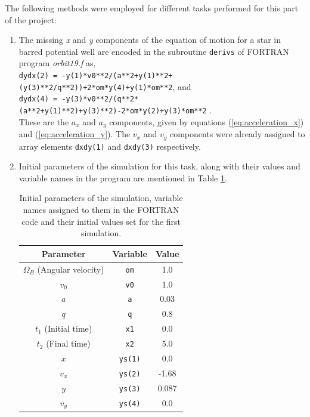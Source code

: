 \documentclass[a4paper]{article}
\begin{document}
		The following methods were employed for different tasks performed for this part of the project:
		\begin{enumerate}
			
			\item The missing \textit{x} and \textit{y} components of the equation of motion for a star in barred potential well are encoded in the subroutine \texttt{derivs} of FORTRAN program \textit{orbit19.f} as, \\
			
			\noindent \texttt{dydx(2) = -y(1)*v0**2/(a**2+y(1)**2+(y(3)**2/q**2))+2*om*y(4)+y(1)*om**2}, and \\
			\texttt{dydx(4) = -y(3)*v0**2/(q**2*(a**2+y(1)**2)+y(3)**2)-2*om*y(2)+y(3)*om**2} . \\
			
			These are the \(a_x\) and \(a_y\) components, given by equations (\ref{eq:acceleration_x}) and (\ref{eq:acceleration_y}). The \(v_x\) and \(v_y\) components were already assigned to array elements \texttt{dxdy(1)} and \texttt{dxdy(3)} respectively.
			
			\item Initial parameters of the simulation for this task, along with their values and variable names in the program are mentioned in Table \ref{table:task1.2}. 
			
			\begin{table} 
				\centering
				\begin{tabular} {c c c}
					\toprule
					\textbf{Parameter} & \textbf{Variable} & \textbf{Value} \\
					\midrule
					\(\Omega_B\) (Angular velocity) & \texttt{om} & 1.0 \\
					\(v_0\) & \texttt{v0} & 1.0 \\
					\(a\) & \texttt{a} & 0.03 \\
					\(q\) & \texttt{q} & 0.8 \\
					\(t_1\) (Initial time) & \texttt{x1} & 0.0 \\
					\(t_2\) (Final time) & \texttt{x2} & 5.0 \\
					\(x\) & \texttt{ys(1)} & 0.0 \\
					\(v_x\) & \texttt{ys(2)} & -1.68 \\
					\(y\) & \texttt{ys(3)} & 0.087 \\
					\(v_y\) & \texttt{ys(4)} & 0.0 \\
					\bottomrule
				\end{tabular}
			\caption{Initial parameters of the simulation, variable names assigned to them in the FORTRAN code and their initial values set for the first simulation.}
			\label{table:task1.2}
			\end{table}
			

\end{enumerate}
\end{document}
